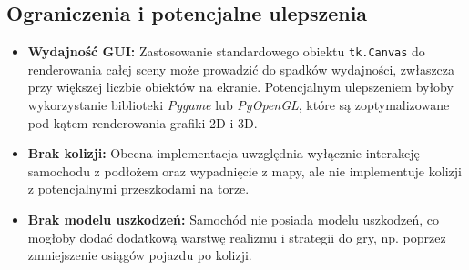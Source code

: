 \documentclass{article}
\begin{document}
\subsection{Ograniczenia i potencjalne ulepszenia}
\begin{itemize}
    \item \textbf{Wydajność GUI:} Zastosowanie standardowego obiektu \texttt{tk.Canvas} do renderowania całej sceny może prowadzić do spadków wydajności, zwłaszcza przy większej liczbie obiektów na ekranie. Potencjalnym ulepszeniem byłoby wykorzystanie biblioteki \textit{Pygame} lub \textit{PyOpenGL}, które są zoptymalizowane pod kątem renderowania grafiki 2D i 3D.
    \item \textbf{Brak kolizji:} Obecna implementacja uwzględnia wyłącznie interakcję samochodu z podłożem oraz wypadnięcie z mapy, ale nie implementuje kolizji z potencjalnymi przeszkodami na torze.
    \item \textbf{Brak modelu uszkodzeń:} Samochód nie posiada modelu uszkodzeń, co mogłoby dodać dodatkową warstwę realizmu i strategii do gry, np. poprzez zmniejszenie osiągów pojazdu po kolizji.
\end{itemize}
\end{document}
